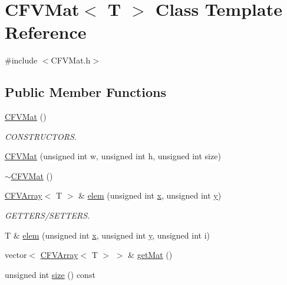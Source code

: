 \hypertarget{classFVL_1_1CFVMat}{
\section{CFVMat$<$ T $>$ Class Template Reference}
\label{d9/dcb/classFVL_1_1CFVMat}
}


{\ttfamily \#include $<$CFVMat.h$>$}

\subsection*{Public Member Functions}
\begin{DoxyCompactItemize}
\item 
\hyperlink{classFVL_1_1CFVMat_a51ff8888d077d558b27474c15368baf9}{CFVMat} ()
\begin{DoxyCompactList}\small\item\em CONSTRUCTORS. \item\end{DoxyCompactList}\item 
\hyperlink{classFVL_1_1CFVMat_a90b5cd38bfc076884d1f3cacc9f35cee}{CFVMat} (unsigned int w, unsigned int h, unsigned int size)
\item 
\hyperlink{classFVL_1_1CFVMat_a9746a1a3f248769a1268c2a225cedd52}{$\sim$CFVMat} ()
\item 
\hyperlink{classFVL_1_1CFVArray}{CFVArray}$<$ T $>$ \& \hyperlink{classFVL_1_1CFVMat_ab179d788531c0f2d2f17e75896112f63}{elem} (unsigned int \hyperlink{FVL_2FVPoint2D_8h_a9a4f74af87a76a4c3dcb729cb0e68f8d}{x}, unsigned int \hyperlink{FVL_2FVPoint2D_8h_a1cb2b5ea04251d543e49356ef54eb853}{y})
\begin{DoxyCompactList}\small\item\em GETTERS/SETTERS. \item\end{DoxyCompactList}\item 
T \& \hyperlink{classFVL_1_1CFVMat_a2d02be460deeb3ad73a4bf0a3f9beb4d}{elem} (unsigned int \hyperlink{FVL_2FVPoint2D_8h_a9a4f74af87a76a4c3dcb729cb0e68f8d}{x}, unsigned int \hyperlink{FVL_2FVPoint2D_8h_a1cb2b5ea04251d543e49356ef54eb853}{y}, unsigned int i)
\item 
vector$<$ \hyperlink{classFVL_1_1CFVArray}{CFVArray}$<$ T $>$ $>$ \& \hyperlink{classFVL_1_1CFVMat_a434d97b662d1620513d0f27ecd0e9b1e}{getMat} ()
\item 
unsigned int \hyperlink{classFVL_1_1CFVMat_a90ca964ebcc1b02bbcde225edd49e812}{size} () const 
\item 

\end{DoxyCompactItemize}
